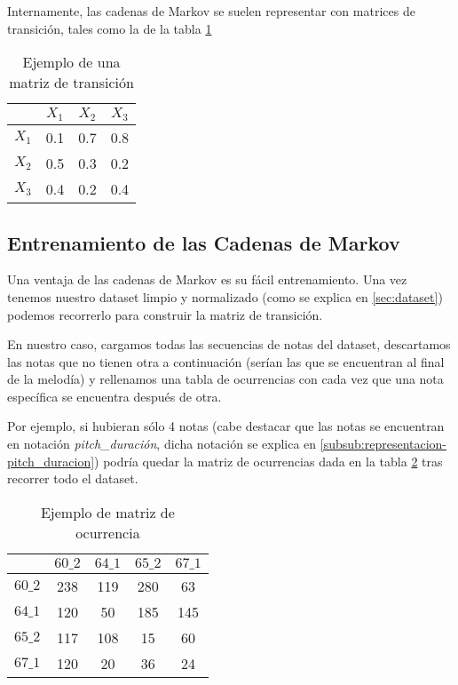     Internamente, las cadenas de Markov se suelen representar con matrices de transición, tales como la de la tabla \ref{tab:sampleChainMatrix}

    \begin{table}
	\centering
	\begin{tabular}{c|c|c|c}
		\textbf{} & \textbf{$X_1$} & \textbf{$X_2$} & \textbf{$X_3$}\\
		\hline
		\textbf{$X_1$} & 0.1 & 0.7 & 0.8\\
		\hline
		\textbf{$X_2$} & 0.5 & 0.3 & 0.2\\
		\hline
		\textbf{$X_3$} & 0.4 & 0.2 & 0.4\\
	\end{tabular}
	\caption{Ejemplo de una matriz de transición}
	\label{tab:sampleChainMatrix}
    \end{table}
    
    \subsection{Entrenamiento de las Cadenas de Markov}
    \label{subsec:entrenamientoCadenasMarkov}
    Una ventaja de las cadenas de Markov es su fácil entrenamiento. Una vez tenemos nuestro dataset limpio y normalizado (como se explica en \ref{sec:dataset}) podemos recorrerlo para construir la matriz de transición.

    En nuestro caso, cargamos todas las secuencias de notas del dataset, descartamos las notas que no tienen otra a continuación (serían las que se encuentran al final de la melodía) y rellenamos una tabla de ocurrencias con cada vez que una nota específica se encuentra después de otra.

    Por ejemplo, si hubieran sólo 4 notas (cabe destacar que las notas se encuentran en notación \textit{pitch\_duración}, dicha notación se explica en \ref{subsub:representacion-pitch_duracion}) podría quedar la matriz de ocurrencias dada en la tabla \ref{tab:sampleOcurrenceMatrix} tras recorrer todo el dataset.

    \begin{table}
	\centering
	\begin{tabular}{c|c|c|c|c}
		\textbf{} & \textbf{$60\_2$} & \textbf{$64\_1$} &         
            \textbf{$65\_2$} &     \textbf{$67\_1$}\\
		\hline
		\textbf{$60\_2$} & 238 & 119 & 280 & 63\\
		\hline
		\textbf{$64\_1$} & 120 & 50 & 185 & 145\\
		\hline
		\textbf{$65\_2$} & 117 & 108 & 15 & 60\\
		\hline
		\textbf{$67\_1$} & 120 & 20 & 36 & 24\\
	\end{tabular}
	\caption{Ejemplo de matriz de ocurrencia}
	\label{tab:sampleOcurrenceMatrix}
    \end{table}

